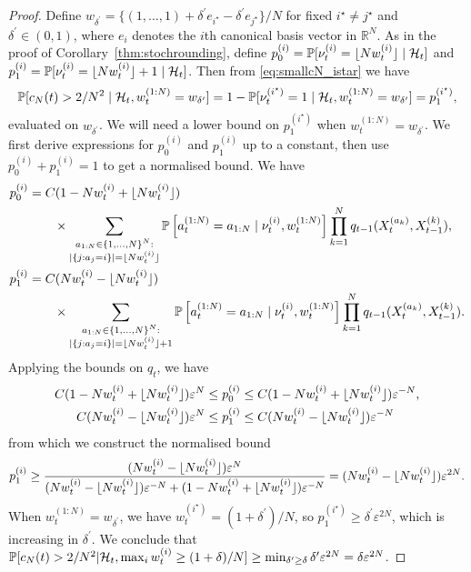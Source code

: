 \begin{proof}
Define $w_{\delta^\prime} = \{(1,\dots,1) + \delta^\prime e_{i^\star} - \delta^\prime e_{j^\star} \} /N$ for fixed $i^\star \neq j^\star$ and $\delta^\prime \in (0,1)$, where $e_i$ denotes the $i$th canonical basis vector in $\mathbb{R}^N$. 
As in the proof of Corollary~\ref{thm:stochrounding}, define $p_0^{(i)} = \mathbb{P}[ \nu_t^{(i)} = \lfloor N w_t^{(i)} \rfloor \mid \mathcal{H}_t ]$ and $p_1^{(i)} = \mathbb{P}[ \nu_t^{(i)} = \lfloor N w_t^{(i)} \rfloor +1 \mid \mathcal{H}_t ]$. Then from \eqref{eq:smallcN_istar} we have
\begin{equation*}
\mathbb{P}[ c_N(t) > 2/N^2 \mid \mathcal{H}_t, w_t^{(1:N)} = w_{\delta^\prime} ]
= 1- \mathbb{P}[ \nu_t^{(i^\star)} = 1 \mid \mathcal{H}_t, w_t^{(1:N)} = w_{\delta^\prime} ]
= p_1^{(i^\star)},
\end{equation*}
evaluated on $w_{\delta^\prime}$.
We will need a lower bound on $p_1^{(i^\star)}$ when $w_t^{(1:N)} = w_{\delta^\prime}$. 
We first derive expressions for $p_0^{(i)}$ and $p_1^{(i)}$ up to a constant, then use $p_0^{(i)} + p_1^{(i)} =1$ to get a normalised bound. We have
\begin{align*} 
p_0^{(i)} &= C (1- N w_t^{(i)} + \lfloor N w_t^{(i)} \rfloor) \\
&\qquad \times \sum_{\substack{a_{1:N} \in \{1,\dots,N\}^N : \\ |\{j: a_j=i\}|=\lfloor N w_t^{(i)} \rfloor }}
\mathbb{P}\left[ a_t^{(1:N)} = a_{1:N} \mid \nu_t^{(i)}, w_t^{(1:N)} \right]
\prod_{k=1}^N q_{t-1}( X_t^{(a_k)}, X_{t-1}^{(k)} ) ,\\
p_1^{(i)} &= C (N w_t^{(i)} - \lfloor N w_t^{(i)} \rfloor) \\
&\qquad \times \sum_{\substack{a_{1:N} \in \{1,\dots,N\}^N : \\ |\{j: a_j=i\}|=\lfloor N w_t^{(i)} \rfloor +1 }}
\mathbb{P}\left[ a_t^{(1:N)} = a_{1:N} \mid \nu_t^{(i)}, w_t^{(1:N)} \right]
\prod_{k=1}^N q_{t-1}( X_t^{(a_k)}, X_{t-1}^{(k)} ) .
\end{align*}
Applying the bounds on $q_t$, we have
\begin{align*}
C (1- N w_t^{(i)} + \lfloor N w_t^{(i)} \rfloor) \varepsilon^N &\leq p_0^{(i)} \leq C (1- N w_t^{(i)} + \lfloor N w_t^{(i)} \rfloor) \varepsilon^{-N} ,\\
C (N w_t^{(i)} - \lfloor N w_t^{(i)} \rfloor) \varepsilon^N &\leq p_1^{(i)} \leq C (N w_t^{(i)} - \lfloor N w_t^{(i)} \rfloor) \varepsilon^{-N}
\end{align*}
from which we construct the normalised bound
\begin{equation*}
p_1^{(i)} \geq \frac{ (Nw_t^{(i)} - \lfloor N w_t^{(i)} \rfloor) \varepsilon^{N} }{ (Nw_t^{(i)} - \lfloor N w_t^{(i)} \rfloor) \varepsilon^{-N} + (1- Nw_t^{(i)} +\lfloor N w_t^{(i)} \rfloor) \varepsilon^{-N}}
= (Nw_t^{(i)} - \lfloor N w_t^{(i)} \rfloor) \varepsilon^{2N} .
\end{equation*}
When $w_t^{(1:N)} = w_{\delta^\prime}$, we have $w_t^{(i^\star)} = (1+\delta^\prime)/N$, so $p_1^{(i^\star)} \geq \delta^\prime \varepsilon^{2N}$,
which is increasing in $\delta^\prime$.
We conclude that $\mathbb{P}[ c_N(t) > 2/N^2 | \mathcal{H}_t, \max_i w_t^{(i)} \geq (1+\delta)/N ] \geq \min_{\delta^\prime \geq \delta} \delta^\prime \varepsilon^{2N} = \delta \varepsilon^{2N}$.


\end{proof}
